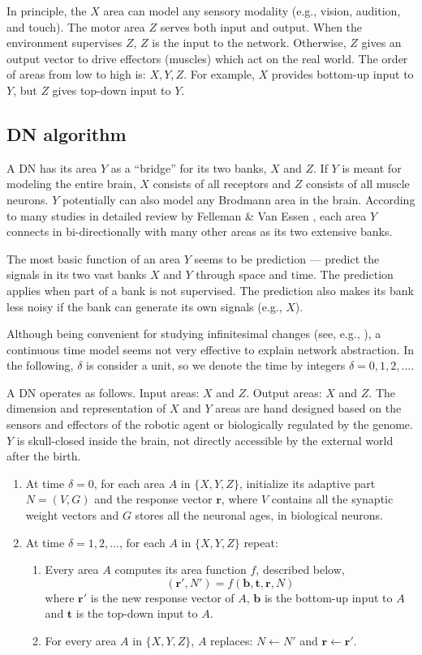 \documentclass[conference]{IEEEtran}
\def\b{\mathbf b}
\def\r{\mathbf r}
\def\t{\mathbf t}
\begin{document}
In principle, the $X$ area can model any sensory modality (e.g., vision, audition, and touch). 
The motor area $Z$ serves both input and output.  When the environment supervises $Z$, $Z$ is the input
to the network.  Otherwise, $Z$ gives an output vector to drive effectors (muscles) which act on the real world. 
The order of areas from low to high is: $X, Y, Z$.   For example, 
$X$ provides bottom-up input to $Y$, but $Z$ gives top-down input to $Y$.  

\subsection{DN algorithm}
A DN has its area $Y$ as a ``bridge'' for its two banks, $X$ and $Z$.
If $Y$ is meant for modeling the entire brain, $X$ consists of all receptors and $Z$ consists of all muscle 
neurons.   $Y$ potentially can also model any Brodmann area in the brain.   According to 
many studies in detailed review
by Felleman \& Van Essen \cite{FellemanVanEssen91}, each area $Y$ connects in bi-directionally with many other
areas as its two extensive banks.  

The most basic function of an area $Y$ seems to be prediction --- predict the signals in its two vast banks $X$ and $Y$ through
space and time.   The prediction applies when part of a bank is not supervised. 
The prediction also makes its bank less noisy if the bank can generate its own signals (e.g., $X$).    

Although being convenient for studying infinitesimal changes (see, e.g., \cite{Izhikevich07}), a continuous time model  seems not very effective to explain network abstraction.   In the following, $\delta$ is consider a unit, so we denote the time by integers $\delta=0, 1, 2, ...$.  

A DN operates as follows.  
Input areas: $X$ and $Z$.  Output areas: $X$ and $Z$.   The dimension and representation of $X$ and $Y$ areas are hand designed based on the sensors and effectors of the robotic agent or biologically regulated by the genome. $Y$ is skull-closed inside the brain, not directly accessible  by the external world after the birth.     
\begin{enumerate}
\item At time $\delta=0$, for each area $A$ in $\{X, Y, Z\}$, initialize 
its adaptive part $N=(V, G)$ and the response vector $\r$, where $V$ contains all the synaptic weight vectors and $G$ stores all the neuronal ages, in biological neurons.
\item At time $\delta=1, 2, ... $, for each $A$ in $\{X, Y, Z\}$ repeat: 
\begin{enumerate}
\item Every area $A$ computes its area function $f$, described below, 
\begin{equation}
(\r', N') = f(\b, \t, \r, N)
\end{equation}
where $\r'$ is the new response vector of $A$, $\b$ is the bottom-up input to $A$ and $\t$ is the top-down input to $A$.  
\item For every area $A$ in $\{X, Y, Z\}$, $A$ replaces: $N\leftarrow N'$ and $\r \leftarrow \r'$.
\end{enumerate}
\end{enumerate}
\end{document}
